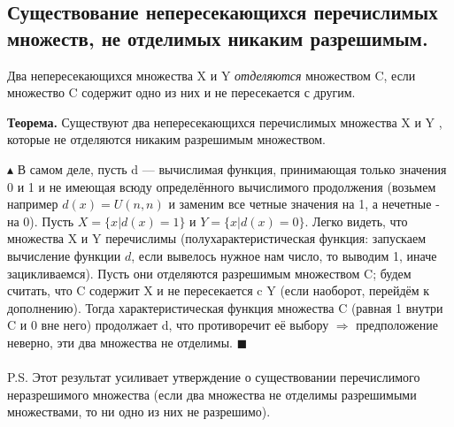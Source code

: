\subsection{Существование непересекающихся перечислимых множеств, не отделимых никаким разрешимым.}

Два непересекающихся множества X и Y \emph{отделяются} множеством C, если множество C содержит одно из них
и не пересекается с другим.

\textbf{Теорема.} Существуют два непересекающихся перечислимых множества X и Y , которые не отделяются никаким разрешимым множеством.

$\blacktriangle$
В самом деле, пусть d — вычислимая функция, принимающая только значения 0 и 1 и не имеющая всюду определённого вычислимого продолжения (возьмем например $d(x)=U(n,n)$ и заменим все четные значения на 1, а нечетные - на 0). Пусть $X = \{x | d(x) = 1\}$ и $Y = \{x | d(x) = 0\}$.
Легко видеть, что множества X и Y перечислимы (полухарактеристическая функция: запускаем вычисление функции $d$, если вывелось нужное нам число, то выводим 1, иначе зацикливаемся). Пусть они отделяются разрешимым множеством C; будем считать, что C содержит X и не пересекается c Y (если наоборот, перейдём к дополнению). Тогда характеристическая функция множества C (равная 1 внутри C и 0 вне него) продолжает d, что противоречит её выбору $\Rightarrow$ предположение неверно, эти два множества не отделимы.
$\blacksquare$ \\
\\
P.S. Этот результат усиливает утверждение о существовании перечислимого неразрешимого множества (если два множества не отделимы разрешимыми множествами, то ни одно из них не
разрешимо).
